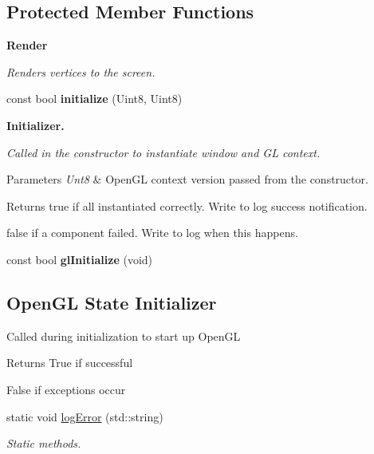 \subsection*{Protected Member Functions}
\begin{Indent}{\bf Render}\par
{\em Renders vertices to the screen. }\begin{DoxyCompactItemize}
\item 
\hypertarget{classngl_1_1gl_application_a4000634c6adff77aaa03e075c6182a28}{}const bool {\bfseries initialize} (Uint8, Uint8)\label{classngl_1_1gl_application_a4000634c6adff77aaa03e075c6182a28}

\end{DoxyCompactItemize}
\end{Indent}
\begin{Indent}{\bf Initializer.}\par
{\em Called in the constructor to instantiate window and G\+L context.


\begin{DoxyParams}{Parameters}
{\em Unt8} & Open\+G\+L context version passed from the constructor. \\
\hline
\end{DoxyParams}
\begin{DoxyReturn}{Returns}
true if all instantiated correctly. Write to log success notification. 

false if a component failed. Write to log when this happens. 
\end{DoxyReturn}
}\begin{DoxyCompactItemize}
\item 
\hypertarget{classngl_1_1gl_application_affbc2c60d6b82273efc9c37c2c80e52c}{}const bool {\bfseries gl\+Initialize} (void)\label{classngl_1_1gl_application_affbc2c60d6b82273efc9c37c2c80e52c}

\end{DoxyCompactItemize}
\end{Indent}
\subsection*{Open\+G\+L State Initializer}
\label{_amgrp08fa2e7c751c21b3c814f2c7d358ee4d}%
Called during initialization to start up Open\+G\+L

\begin{DoxyReturn}{Returns}
True if successful 

False if exceptions occur 
\end{DoxyReturn}
\begin{DoxyCompactItemize}
\item 
static void \hyperlink{classngl_1_1gl_application_a83e1a57223e128f221332aa2bc9e6eda}{log\+Error} (std\+::string)
\begin{DoxyCompactList}\small\item\em Static methods. \end{DoxyCompactList}\end{DoxyCompactItemize}


